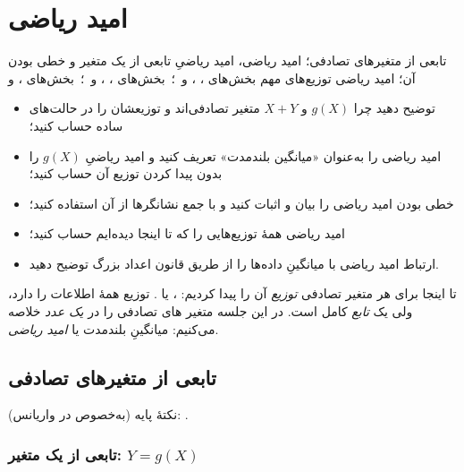 \chapter{امید ریاضی}
\label{ch:s9}

{تابعی از متغیرهای تصادفی؛ امید ریاضی، امید ریاضیِ تابعی از یک متغیر و خطی بودن آن؛ امید ریاضی توزیع‌های مهم}
{ بخش‌های ، ،  و  \,؛\,  بخش‌های ، ،  و  \,؛\,  بخش‌های ،  و }
{\begin{itemize}
    \item توضیح دهید چرا $g(X)$ و $X+Y$ متغیر تصادفی‌اند و توزیعشان را در حالت‌های ساده حساب کنید؛
    \item امید ریاضی را به‌عنوان «میانگین بلندمدت» تعریف کنید و امید ریاضیِ $g(X)$ را بدون پیدا کردن توزیع آن حساب کنید؛
    \item خطی بودن امید ریاضی را بیان و اثبات کنید و با جمع نشانگرها از آن استفاده کنید؛
    \item امید ریاضی همهٔ توزیع‌هایی را که تا اینجا دیده‌ایم حساب کنید؛
    \item ارتباط امید ریاضی با میانگینِ داده‌ها را از طریق قانون اعداد بزرگ توضیح دهید.
  \end{itemize}}

تا اینجا برای هر متغیر تصادفی \emph{توزیع} آن را پیدا کردیم: ،  یا . توزیع همهٔ اطلاعات را دارد، ولی یک \emph{تابع} کامل است. در این جلسه متغیر های تصادفی را در \emph{یک عدد} خلاصه می‌کنیم: میانگینِ بلندمدت یا \emph{امید ریاضی}.

\section{تابعی از متغیرهای تصادفی}
\label{sec:functions}

نکتهٔ پایه (به‌خصوص در واریانس): .

\subsection{تابعی از یک متغیر: $Y=g(X)$}

